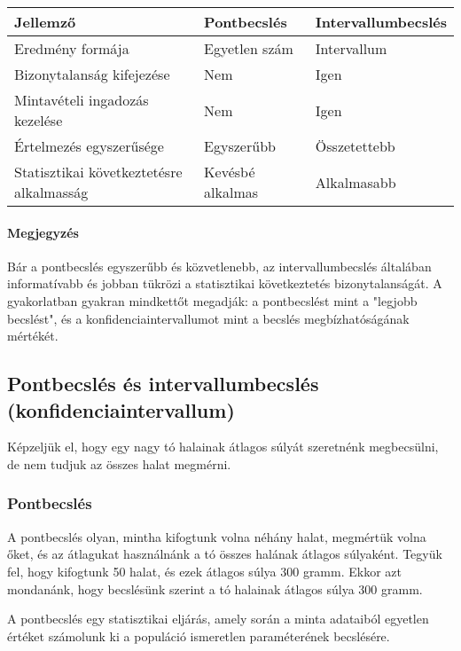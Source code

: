 \documentclass[a4paper,12pt]{article}
\begin{document}
    \begin{tabular}{|l|l|l|}
        \hline
        Jellemző                                 & Pontbecslés      & Intervallumbecslés \\
        \hline
        Eredmény formája                         & Egyetlen szám    & Intervallum        \\
        Bizonytalanság kifejezése                & Nem              & Igen               \\
        Mintavételi ingadozás kezelése           & Nem              & Igen               \\
        Értelmezés egyszerűsége                  & Egyszerűbb       & Összetettebb       \\
        Statisztikai következtetésre alkalmasság & Kevésbé alkalmas & Alkalmasabb        \\
        \hline
    \end{tabular}

    \paragraph{Megjegyzés}
    Bár a pontbecslés egyszerűbb és közvetlenebb, az intervallumbecslés általában informatívabb és jobban tükrözi a statisztikai következtetés bizonytalanságát. A gyakorlatban gyakran mindkettőt megadják: a pontbecslést mint a "legjobb becslést", és a konfidenciaintervallumot mint a becslés megbízhatóságának mértékét.

    \subsection{Pontbecslés és intervallumbecslés (konfidenciaintervallum)}

    Képzeljük el, hogy egy nagy tó halainak átlagos súlyát szeretnénk megbecsülni, de nem tudjuk az összes halat megmérni.

    \subsubsection{Pontbecslés}

    A pontbecslés olyan, mintha kifogtunk volna néhány halat, megmértük volna őket, és az átlagukat használnánk a tó összes halának átlagos súlyaként. Tegyük fel, hogy kifogtunk 50 halat, és ezek átlagos súlya 300 gramm. Ekkor azt mondanánk, hogy becslésünk szerint a tó halainak átlagos súlya 300 gramm.


    A pontbecslés egy statisztikai eljárás, amely során a minta adataiból egyetlen értéket számolunk ki a populáció ismeretlen paraméterének becslésére.
\end{document}
